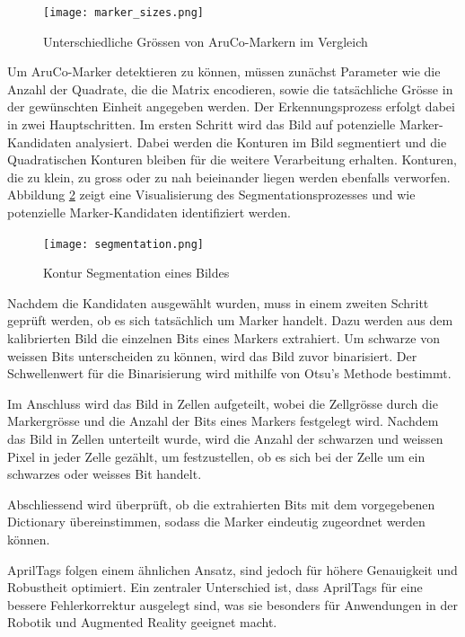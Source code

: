 \begin{figure}[H]
    \centering
    \texttt{[image: marker\_sizes.png]}
    \caption{Unterschiedliche Grössen von AruCo-Markern im Vergleich}
    \label{fig:sizes}
\end{figure}


Um AruCo-Marker detektieren zu können, müssen zunächst Parameter wie die Anzahl der Quadrate, die die Matrix encodieren,
sowie die tatsächliche Grösse in der gewünschten Einheit angegeben werden. Der Erkennungsprozess erfolgt dabei in zwei 
Hauptschritten. Im ersten Schritt wird das Bild auf potenzielle Marker-Kandidaten analysiert. Dabei werden die Konturen
im Bild segmentiert und die Quadratischen Konturen bleiben für die weitere Verarbeitung erhalten. 
Konturen, die zu klein, zu gross oder zu nah beieinander liegen werden ebenfalls verworfen.
Abbildung \ref{fig:segmentation} zeigt eine Visualisierung des Segmentationsprozesses und wie potenzielle
Marker-Kandidaten identifiziert werden.

\begin{figure}[H]
    \centering
    \texttt{[image: segmentation.png]}
    \caption{Kontur Segmentation eines Bildes}
    \label{fig:segmentation}
\end{figure}

Nachdem die Kandidaten ausgewählt wurden, muss in einem zweiten Schritt geprüft werden, ob es sich tatsächlich um Marker handelt.
Dazu werden aus dem kalibrierten Bild die einzelnen Bits eines Markers extrahiert. Um schwarze von weissen Bits unterscheiden zu können,
wird das Bild zuvor binarisiert. Der Schwellenwert für die Binarisierung wird mithilfe von Otsu's Methode bestimmt.

Im Anschluss wird das Bild in Zellen aufgeteilt, wobei die Zellgrösse durch die Markergrösse und die Anzahl der Bits eines Markers festgelegt
wird. Nachdem das Bild in Zellen unterteilt wurde, wird die Anzahl der schwarzen und weissen Pixel in jeder Zelle gezählt, um festzustellen, 
ob es sich bei der Zelle um ein schwarzes oder weisses Bit handelt.

Abschliessend wird überprüft, ob die extrahierten Bits mit dem vorgegebenen Dictionary übereinstimmen, sodass die Marker eindeutig zugeordnet werden können.

AprilTags folgen einem ähnlichen Ansatz, sind jedoch für höhere Genauigkeit und Robustheit optimiert. Ein zentraler Unterschied ist, dass AprilTags für eine
bessere Fehlerkorrektur ausgelegt sind, was sie besonders für Anwendungen in der Robotik und Augmented Reality geeignet macht.



